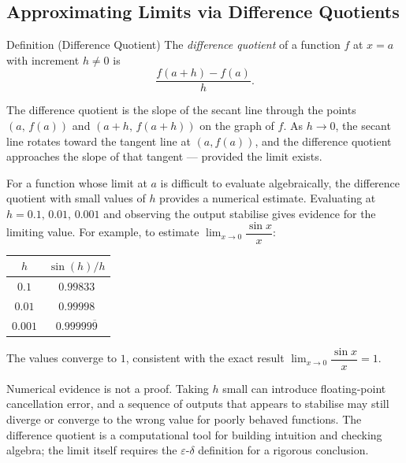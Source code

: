 \subsection{Approximating Limits via Difference Quotients}

\begin{propositionbox}{Definition (Difference Quotient)}
The \emph{difference quotient} of a function $f$ at $x = a$ with
increment $h \neq 0$ is
\[
  \frac{f(a + h) - f(a)}{h}.
\]
\end{propositionbox}

\begin{remark*}
The difference quotient is the slope of the secant line through
the points $(a,\, f(a))$ and $(a+h,\, f(a+h))$ on the graph of $f$.
As $h \to 0$, the secant line rotates toward the tangent line at
$(a, f(a))$, and the difference quotient approaches the slope of
that tangent --- provided the limit exists.
\end{remark*}

\begin{remark*}
For a function whose limit at $a$ is difficult to evaluate
algebraically, the difference quotient with small values of $h$
provides a numerical estimate.
Evaluating at $h = 0.1,\, 0.01,\, 0.001$ and observing the
output stabilise gives evidence for the limiting value.
For example, to estimate $\lim_{x \to 0} \dfrac{\sin x}{x}$:

\medskip
\begin{center}
\begin{tabular}{@{}cc@{}}
\textbf{$h$} & \textbf{$\sin(h)/h$} \\
\hline
$0.1$    & $0.99833$ \\
$0.01$   & $0.99998$ \\
$0.001$  & $0.99999\overline{9}$ \\
\end{tabular}
\end{center}
\medskip

The values converge to $1$, consistent with the exact result
$\lim_{x \to 0} \dfrac{\sin x}{x} = 1$.
\end{remark*}

\begin{remark*}
Numerical evidence is not a proof.
Taking $h$ small can introduce floating-point cancellation error,
and a sequence of outputs that appears to stabilise may still
diverge or converge to the wrong value for poorly behaved
functions.
The difference quotient is a computational tool for building
intuition and checking algebra; the limit itself requires the
$\varepsilon$-$\delta$ definition for a rigorous conclusion.
\end{remark*}